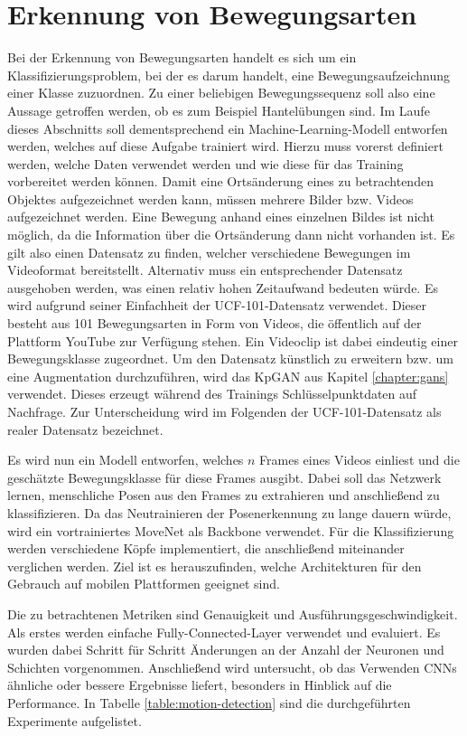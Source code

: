 \section{Erkennung von Bewegungsarten}
Bei der Erkennung von Bewegungsarten handelt es sich um ein
Klassifizierungsproblem, bei der es darum handelt, eine Bewegungsaufzeichnung
einer Klasse zuzuordnen. Zu einer beliebigen Bewegungssequenz soll also eine
Aussage getroffen werden, ob es zum Beispiel Hantelübungen sind. Im Laufe dieses
Abschnitts soll dementsprechend ein Machine-Learning-Modell entworfen werden,
welches auf diese Aufgabe trainiert wird. Hierzu muss vorerst definiert werden,
welche Daten verwendet werden und wie diese für das Training vorbereitet werden
können. Damit eine Ortsänderung eines zu betrachtenden Objektes aufgezeichnet
werden kann, müssen mehrere Bilder bzw. Videos aufgezeichnet werden. Eine
Bewegung anhand eines einzelnen Bildes ist nicht möglich, da die Information
über die Ortsänderung dann nicht vorhanden ist. Es gilt also einen Datensatz zu
finden, welcher verschiedene Bewegungen im Videoformat bereitstellt. Alternativ
muss ein entsprechender Datensatz ausgehoben werden, was einen relativ hohen
Zeitaufwand bedeuten würde. Es wird aufgrund seiner Einfachheit der
UCF-101-Datensatz \cite{ucf101} verwendet. Dieser besteht aus 101 Bewegungsarten
in Form von Videos, die öffentlich auf der Plattform YouTube zur Verfügung
stehen. Ein Videoclip ist dabei eindeutig einer Bewegungsklasse zugeordnet. Um
den Datensatz künstlich zu erweitern bzw. um eine Augmentation durchzuführen,
wird das KpGAN aus Kapitel \ref{chapter:gans} verwendet. Dieses erzeugt während des Trainings Schlüsselpunktdaten auf Nachfrage. Zur Unterscheidung wird im Folgenden der UCF-101-Datensatz als realer Datensatz bezeichnet.

Es wird nun ein Modell entworfen, welches $n$ Frames eines Videos einliest und
die geschätzte Bewegungsklasse für diese Frames ausgibt. Dabei soll das Netzwerk
lernen, menschliche Posen aus den Frames zu extrahieren und anschließend zu
klassifizieren. Da das Neutrainieren der Posenerkennung zu lange dauern würde,
wird ein vortrainiertes MoveNet als Backbone verwendet. Für die Klassifizierung
werden verschiedene Köpfe implementiert, die anschließend miteinander verglichen
werden. Ziel ist es herauszufinden, welche Architekturen für den Gebrauch auf
mobilen Plattformen geeignet sind.

Die zu betrachtenen Metriken sind Genauigkeit und
Aus\-führ\-ungs\-ge\-schwin\-dig\-keit. Als erstes werden einfache
Fully-Connected-Layer verwendet und evaluiert. Es wurden dabei Schritt für
Schritt Änderungen an der Anzahl der Neuronen und Schichten vorgenommen.
Anschließend wird untersucht, ob das Verwenden CNNs ähnliche oder bessere
Ergebnisse liefert, besonders in Hinblick auf die Performance. In Tabelle
\ref{table:motion-detection} sind die durchgeführten Experimente aufgelistet.

